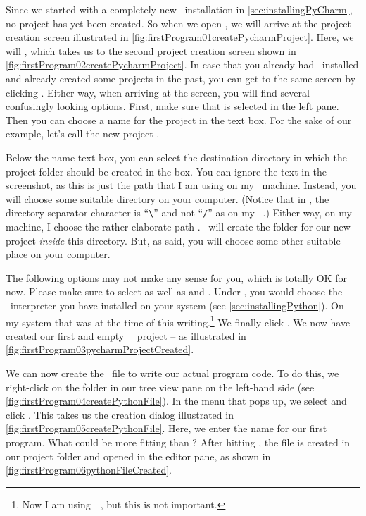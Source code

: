Since we started with a completely new \pycharm\ installation in \cref{sec:installingPyCharm}, no project has yet been created.
So when we open \pycharm, we will arrive at the project creation screen illustrated in \cref{fig:firstProgram01createPycharmProject}.
Here, we will , which takes us to the second project creation screen shown in \cref{fig:firstProgram02createPycharmProject}.
In case that you already had \pycharm\ installed and already created some projects in the past, you can get to the same screen by clicking .
Either way, when arriving at the screen, you will find several confusingly looking options.
First, make sure that  is selected in the left pane.
Then you can choose a name for the project in the  text box.
For the sake of our example, let's call the new project .

Below the name text box, you can select the destination directory in which the project folder should be created in the  box.
You can ignore the text in the screenshot, as this is just the path that I am using on my \ubuntu\ machine.
Instead, you will choose some suitable directory on your computer.
(Notice that in \windows, the directory separator character is ``\verb=\='' and not ``\verb=/='' as on my \ubuntu\ \linux.)
Either way, on my machine, I choose the rather elaborate path .
\pycharm\ will create the folder  for our new project \emph{inside} this directory.
But, as said, you will choose some other suitable place on your computer.

The following options may not make any sense for you, which is totally OK for now.
Please make sure to select  as well as  and .
Under , you would choose the \python\ interpreter you have installed on your system (see \cref{sec:installingPython}).
On my system that was  at the time of this writing.\footnote{%
Now I am using~\python~\pythonVersion, but this is not important.}
We finally click .
We now have created our first and empty \pycharm\ \python\ project -- as illustrated in \cref{fig:firstProgram03pycharmProjectCreated}.

We can now create the \python\ file to write our actual program code.
To do this, we right-click on the folder  in our  tree view pane on the left-hand side (see \cref{fig:firstProgram04createPythonFile}).
In the menu that pops up, we select and click .
This takes us the  creation dialog illustrated in \cref{fig:firstProgram05createPythonFile}.
Here, we enter the name for our first program.
What could be more fitting than ?
After hitting , the file is created in our project folder and opened in the editor pane, as shown in \cref{fig:firstProgram06pythonFileCreated}.

